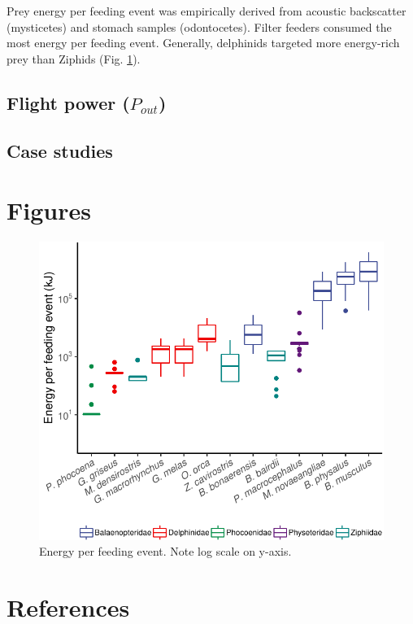 \documentclass[]{elsarticle} %
\makeatletter
\def\maxwidth{\ifdim\Gin@nat@width>\linewidth\linewidth
\else\Gin@nat@width\fi}
\let\Oldincludegraphics\includegraphics
\renewcommand{\includegraphics}[1]{\Oldincludegraphics[width=\maxwidth]{#1}}
\makeatother
\begin{document}
Prey energy per feeding event was empirically derived from acoustic
backscatter (mysticetes) and stomach samples (odontocetes). Filter
feeders consumed the most energy per feeding event. Generally,
delphinids targeted more energy-rich prey than Ziphids (Fig.
\ref{Ep_fig}).

\subsection{\texorpdfstring{Flight power
(\(P_{out}\))}{Flight power (P\_\{out\})}}\label{flight-power-p_out-1}

\subsection{Case studies}\label{case-studies-1}

\section{Figures}\label{figures}

\begin{figure}
\centering
\includegraphics{Sonar_Response_Manuscript_files/figure-latex/unnamed-chunk-2-1.pdf}
\caption{Energy per feeding event. Note log scale on y-axis.
\label{Ep_fig}}
\end{figure}

\section*{References}\label{references}
\end{document}
